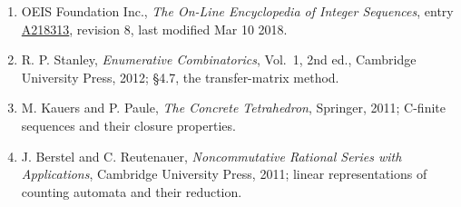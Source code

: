 \documentclass[11pt]{article}
\theoremstyle{definition}
\begin{document}
\begin{enumerate}

\item OEIS Foundation Inc., \emph{The On-Line Encyclopedia of Integer Sequences}, entry \href{https://oeis.org/A218313}{A218313}, revision 8, last modified Mar 10 2018.

\item R. P. Stanley, \emph{Enumerative Combinatorics}, Vol.~1, 2nd ed., Cambridge University Press, 2012; \S4.7, the transfer-matrix method.

\item M. Kauers and P. Paule, \emph{The Concrete Tetrahedron}, Springer, 2011; C-finite sequences and their closure properties.

\item J. Berstel and C. Reutenauer, \emph{Noncommutative Rational Series with Applications}, Cambridge University Press, 2011; linear representations of counting automata and their reduction.

\end{enumerate}
\end{document}
